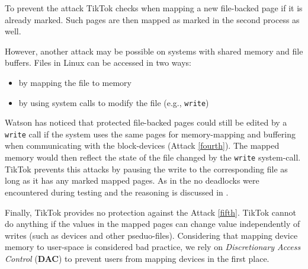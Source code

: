 

To prevent the attack TikTok checks when mapping a new file-backed page if
it is already marked. Such pages are then mapped as marked in the second process
as well.

However, another attack may be possible on systems with shared memory and file buffers.
Files in Linux can be accessed in two ways:
\begin{itemize}
    \item by mapping the file to memory
    \item by using system calls to modify the file (e.g., \texttt{write})
\end{itemize}

Watson\cite{watson2007exploiting} has noticed that protected file-backed pages
could still be edited by a \texttt{write} call if the system uses the same pages
for memory-mapping and buffering when communicating with the block-devices
(Attack \ref{fourth}). The mapped memory would then reflect the state of the
file changed by the \texttt{write} system-call. TikTok prevents this attacks by
pausing the write to the corresponding file as long as it has any marked mapped
pages. As in the  no deadlocks were encountered during
testing and the reasoning is discussed in . 

Finally, TikTok provides no protection against the Attack \ref{fifth}. TikTok
cannot do anything if the values in the mapped pages can change value
independently of writes (such as devices and other pseduo-files). Considering
that mapping device memory to user-space is considered bad practice, we rely on
\emph{Discretionary Access Control} (\textbf{DAC}) to prevent users from mapping
devices in the first place.


